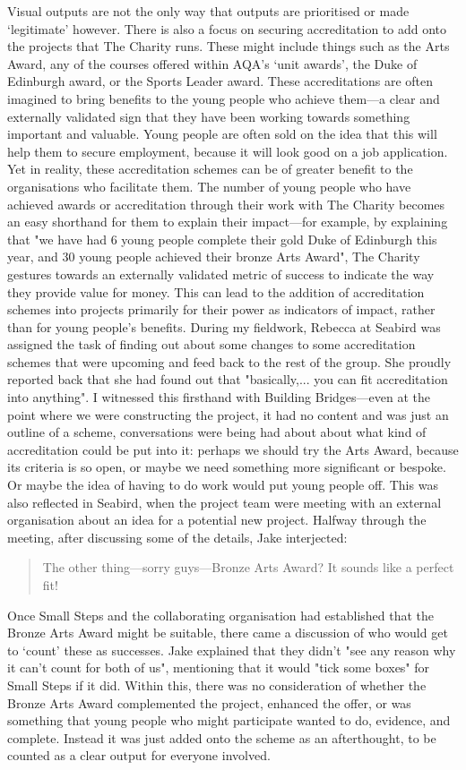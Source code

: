 Visual outputs are not the only way that outputs are prioritised or made `legitimate' however. There is also a focus on securing accreditation to add onto the projects that The Charity runs. These might include things such as the Arts Award, any of the courses offered within AQA's `unit awards', the Duke of Edinburgh award, or the Sports Leader award. These accreditations are often imagined to bring benefits to the young people who achieve them—a clear and externally validated sign that they have been working towards something important and valuable. Young people are often sold on the idea that this will help them to secure employment, because it will look good on a job application. Yet in reality, these accreditation schemes can be of greater benefit to the organisations who facilitate them. The number of young people who have achieved awards or accreditation through their work with The Charity becomes an easy shorthand for them to explain their impact—for example, by explaining that "we have had 6 young people complete their gold Duke of Edinburgh this year, and 30 young people achieved their bronze Arts Award", The Charity gestures towards an externally validated metric of success to indicate the way they provide value for money. This can lead to the addition of accreditation schemes into projects primarily for their power as indicators of impact, rather than for young people's benefits. During my fieldwork, Rebecca at Seabird was assigned the task of finding out about some changes to some accreditation schemes that were upcoming and feed back to the rest of the group. She proudly reported back that she had found out that "basically,... you can fit accreditation into anything". I witnessed this firsthand with Building Bridges—even at the point where we were constructing the project, it had no content and was just an outline of a scheme,  conversations were being had about about what kind of accreditation could be put into it: perhaps we should try the Arts Award, because its criteria is so open, or maybe we need something more significant or bespoke. Or maybe the idea of having to do work would put young people off.  This was also reflected in Seabird, when the project team were meeting with an external organisation about an idea for a potential new project. Halfway through the meeting, after discussing some of the details, Jake interjected:
\begin{quote}
The other thing—sorry guys—Bronze Arts Award? It sounds like a perfect fit!    
\end{quote}
Once Small Steps and the collaborating organisation had established that the Bronze Arts Award might be suitable, there came a discussion of who would get to `count' these as successes. Jake explained that they didn't "see any reason why it can't count for both of us",  mentioning that it would "tick some boxes" for Small Steps if it did. Within this, there was no consideration of whether the Bronze Arts Award complemented the project, enhanced the offer, or was something that young people who might participate wanted to do, evidence, and complete. Instead it was just added onto the scheme as an afterthought, to be counted as a clear output for everyone involved.

